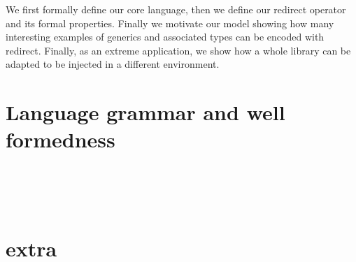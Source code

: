 We first formally define our core language, then we define our redirect operator and
its formal properties.
Finally we motivate our model showing
how many interesting examples of generics and associated types can be encoded with redirect. Finally, as
an extreme application,
we show how a whole library can be adapted to be injected in a different environment.


\section{Language grammar and well formedness}
\begin{bnf}
	\\
	\\
	\\
\end{bnf}

%  
%
%
%
%
%  
%
%
%
%
%


\section{extra}


